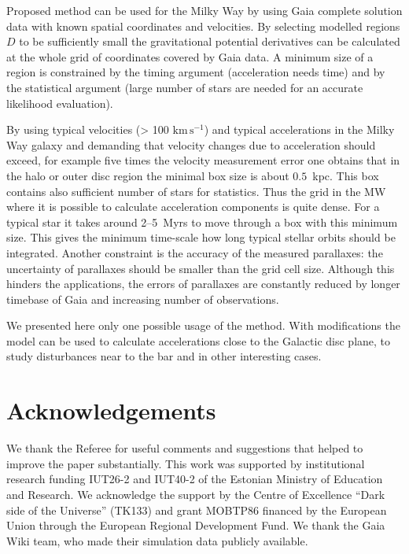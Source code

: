 \documentclass[fleqn,usenatbib]{mnras}
\begin{document}
Proposed method can be used for the Milky Way by using Gaia complete solution data with known spatial coordinates and velocities. By selecting modelled regions $D$ to be sufficiently small the gravitational potential derivatives can be calculated at the whole grid of coordinates covered by Gaia data. A minimum size of a region is constrained by the timing argument (acceleration needs time) and by the statistical argument (large number of stars are needed for an accurate likelihood evaluation). 

By using typical velocities (> 100 $\mathrm{km\,s^{-1}}$) and typical accelerations in the Milky Way galaxy and demanding that velocity changes due to acceleration should exceed, for example five times the velocity measurement error one obtains that in the halo or outer disc region the minimal box size is about $0.5$~kpc. This box contains also sufficient number of stars for statistics. Thus the grid in the MW where it is possible to calculate acceleration components is quite dense. For a typical star it takes around 2--5~Myrs to move through a box with this minimum size. This gives the minimum time-scale how long typical stellar orbits should be integrated. Another constraint is the accuracy of the measured parallaxes: the uncertainty of parallaxes should be smaller than the grid cell size. Although this hinders the applications, the errors of parallaxes are constantly reduced by longer timebase of Gaia and increasing number of observations. 

We presented here only one possible usage of the method. With modifications the model can be used to calculate accelerations close to the Galactic disc plane, to study disturbances near to the bar and in other interesting cases. 


\section*{Acknowledgements}
We thank the Referee for useful comments and suggestions that helped to improve the paper substantially. This work was supported by institutional research funding IUT26-2 and IUT40-2  of the Estonian Ministry of Education and Research. We acknowledge the support by the Centre of Excellence ``Dark side of the Universe'' (TK133) and grant MOBTP86 financed by the European Union through the European Regional Development Fund. 
We thank the Gaia Wiki team, who made their simulation data publicly available. 



\label{lastpage}
\end{document}
